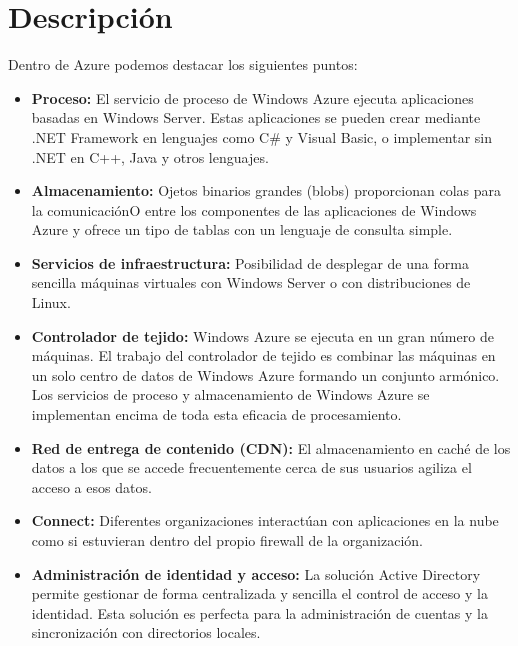 \section{Descripción}
Dentro de Azure podemos destacar los siguientes puntos:
\begin{itemize}
	\item \textbf{Proceso:} El servicio de proceso de Windows Azure ejecuta aplicaciones basadas en Windows Server. Estas aplicaciones se pueden crear mediante .NET Framework en lenguajes como C\# y Visual Basic, o implementar sin .NET en C++, Java y otros lenguajes.	
	\item \textbf{Almacenamiento:} Ojetos binarios grandes (blobs) proporcionan colas para la comunicaciónO entre los componentes de las aplicaciones de Windows Azure y ofrece un tipo de tablas con un lenguaje de consulta simple.
	\item \textbf{Servicios de infraestructura:} Posibilidad de desplegar de una forma sencilla máquinas virtuales con Windows Server o con distribuciones de Linux.	
	\item \textbf{Controlador de tejido:} Windows Azure se ejecuta en un gran número de máquinas. El trabajo del controlador de tejido es combinar las máquinas en un solo centro de datos de Windows Azure formando un conjunto armónico. Los servicios de proceso y almacenamiento de Windows Azure se implementan encima de toda esta eficacia de procesamiento.	
	\item \textbf{Red de entrega de contenido (CDN):} El almacenamiento en caché de los datos a los que se accede frecuentemente cerca de sus usuarios agiliza el acceso a esos datos.	
	\item \textbf{Connect:} Diferentes organizaciones interactúan con aplicaciones en la nube como si estuvieran dentro del propio firewall de la organización.	
	\item \textbf{Administración de identidad y acceso:} La solución Active Directory permite gestionar de forma centralizada y sencilla el control de acceso y la identidad. Esta solución es perfecta para la administración de cuentas y la sincronización con directorios locales.
\end{itemize}
